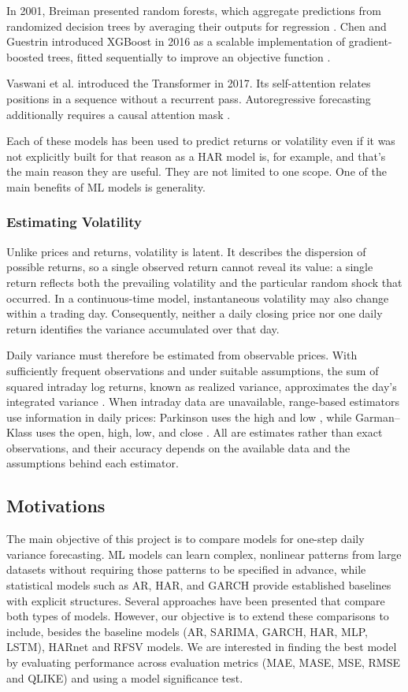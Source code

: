 \documentclass[12pt,a4paper]{article}
\numberwithin{equation}{section}
\numberwithin{table}{section}
\numberwithin{figure}{section}
\begin{document}
In 2001, Breiman presented random forests, which aggregate predictions from randomized decision trees by averaging their outputs for regression \cite{breiman2001}. Chen and Guestrin introduced XGBoost in 2016 as a scalable implementation of gradient-boosted trees, fitted sequentially to improve an objective function \cite{chen2016}.

Vaswani et al. introduced the Transformer in 2017. Its self-attention relates positions in a sequence without a recurrent pass. Autoregressive forecasting additionally requires a causal attention mask \cite{vaswani2017}.

Each of these models has been used to predict returns or volatility even if it was not explicitly built for that reason as a HAR model is, for example, and that's the main reason they are useful. They are not limited to one scope. One of the main benefits of ML models is generality. 

\subsubsection{Estimating Volatility}
Unlike prices and returns, volatility is latent. It describes the dispersion of possible returns, so a single observed return cannot reveal its value: a single return reflects both the prevailing volatility and the particular random shock that occurred. In a continuous-time model, instantaneous volatility may also change within a trading day. Consequently, neither a daily closing price nor one daily return identifies the variance accumulated over that day.

Daily variance must therefore be estimated from observable prices. With sufficiently frequent observations and under suitable assumptions, the sum of squared intraday log returns, known as realized variance, approximates the day's integrated variance \cite{andersen2003}. When intraday data are unavailable, range-based estimators use information in daily prices: Parkinson uses the high and low \cite{parkinson1980}, while Garman--Klass uses the open, high, low, and close \cite{garmanklass1980}. All are estimates rather than exact observations, and their accuracy depends on the available data and the assumptions behind each estimator.


\subsection{Motivations}
The main objective of this project is to compare models for one-step daily variance forecasting. ML models can learn complex, nonlinear patterns from large datasets without requiring those patterns to be specified in advance, while statistical models such as AR, HAR, and GARCH provide established baselines with explicit structures. Several approaches have been presented that compare both types of models. However, our objective is to extend these comparisons to include, besides the baseline models (AR, SARIMA, GARCH, HAR, MLP, LSTM), HARnet and RFSV models. We are interested in finding the best model by evaluating performance across evaluation metrics (MAE, MASE, MSE, RMSE and QLIKE) and using a model significance test.
\end{document}
